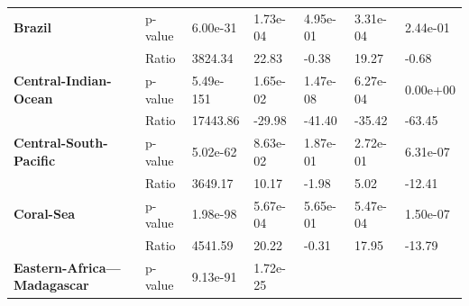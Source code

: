 \begin{table}[H]
{\begin{tabular}{lllllll}
            \textbf{Brazil}                                     & p-value  &
            6.00e-31                                            & 1.73e-04 &
            4.95e-01                                            & 3.31e-04 &
            2.44e-01
            \\
            \textbf{}                                           & Ratio    &
            3824.34                                             & 22.83    &
            -0.38
                                                                & 19.27    &
            -0.68
            \\
            \textbf{Central-Indian-Ocean}                       & p-value  &
            5.49e-151                                           & 1.65e-02 &
            1.47e-08                                            & 6.27e-04 &
            0.00e+00
            \\
            \textbf{}                                           & Ratio    &
            17443.86                                            & -29.98   &
            -41.40
                                                                & -35.42   &
            -63.45
            \\
            \textbf{Central-South-Pacific}                      & p-value  &
            5.02e-62                                            & 8.63e-02 &
            1.87e-01                                            & 2.72e-01 &
            6.31e-07
            \\
            \textbf{}                                           & Ratio    &
            3649.17                                             & 10.17    &
            -1.98
                                                                & 5.02     &
            -12.41
            \\
            \textbf{Coral-Sea}                                  & p-value  &
            1.98e-98                                            & 5.67e-04 &
            5.65e-01                                            & 5.47e-04 &
            1.50e-07
            \\
            \textbf{}                                           & Ratio    &
            4541.59                                             & 20.22    &
            -0.31
                                                                & 17.95    &
            -13.79
            \\
            \textbf{Eastern-Africa---Madagascar}                & p-value  &
            9.13e-91                                            & 1.72e-25 &

\end{tabular}}
\end{table}
